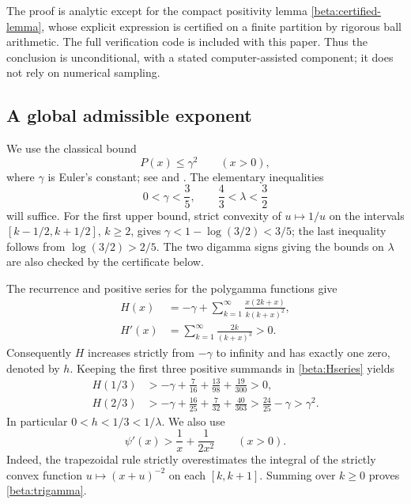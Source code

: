 The proof is analytic except for the compact positivity lemma
\ref{beta:certified-lemma}, whose explicit expression is certified on a finite
partition by rigorous ball arithmetic. The full verification code is included
with this paper. Thus the conclusion is unconditional, with a stated
computer-assisted component; it does not rely on numerical sampling.

\subsection{A global admissible exponent}

We use the classical bound
\begin{equation}\label{beta:productbound}
 P(x)\leq\gamma^2\qquad(x>0),
\end{equation}
where $\gamma$ is Euler's constant; see
\cite[Proposition~4]{AlzerJameson2017} and \cite[Theorem~2]{QLN2025}.
The elementary inequalities
\begin{equation}\label{beta:constants}
 0<\gamma<\frac35,\qquad \frac43<\lambda<\frac32
\end{equation}
will suffice. For the first upper bound, strict convexity of $u\mapsto1/u$
on the intervals $[k-1/2,k+1/2]$, $k\geq2$, gives
$\gamma<1-\log(3/2)<3/5$; the last inequality follows from
$\log(3/2)>2/5$. The two digamma signs giving the bounds on $\lambda$
are also checked by the certificate below.

The recurrence and positive series for the polygamma functions give
\begin{align}
 H(x)&=-\gamma+\sum_{k=1}^\infty
                 \frac{x(2k+x)}{k(k+x)^2},\label{beta:Hseries}\\
 H'(x)&=\sum_{k=1}^\infty\frac{2k}{(k+x)^3}>0.
 \label{beta:Hprime}
\end{align}
Consequently $H$ increases strictly from $-\gamma$ to infinity and has
exactly one zero, denoted by $h$. Keeping the first three positive summands
in \eqref{beta:Hseries} yields
\begin{align}
 H(1/3)&>-\gamma+\frac7{16}+\frac{13}{98}+\frac{19}{300}>0,
 \label{beta:hbound}\\
 H(2/3)&>-\gamma+\frac{16}{25}+\frac7{32}+\frac{40}{363}
             >\frac{24}{25}-\gamma>\gamma^2.
 \label{beta:Hbound}
\end{align}
In particular $0<h<1/3<1/\lambda$.
We also use
\begin{equation}\label{beta:trigamma}
 \psi'(x)>\frac1x+\frac1{2x^2}\qquad(x>0).
\end{equation}
Indeed, the trapezoidal rule strictly overestimates the integral of the
strictly convex function $u\mapsto(x+u)^{-2}$ on each $[k,k+1]$.
Summing over $k\geq0$ proves \eqref{beta:trigamma}.


